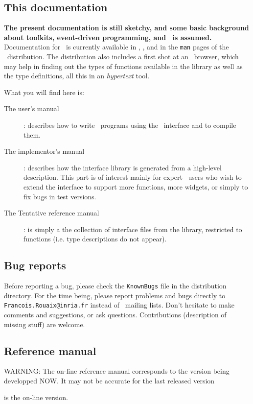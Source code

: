 \section*{This documentation}
{\bf The present documentation is still sketchy, and some basic background
about toolkits, event-driven programming, and \tk\ is assumed.}
Documentation for \tk\ is currently available in \cite{ouster94},
\cite{welch94}, and in the {\tt man} pages of the \tk\ distribution.
The distribution also includes a first shot at an \caml\ browser, which may
help in finding out the types of functions available in the library as well as
the type definitions, all this in an {\em hypertext} tool.


What you will find here is:
\begin{description}
\item[The user's manual] : describes how to write \caml\ programs using the
\tk\ interface and to compile them. 
\item[The implementor's manual] : describes how the interface library is
generated from a high-level description. This part is of interest mainly for
expert \tk\ users who wish to extend the interface to support more
functions, more widgets, or simply to fix bugs in test versions.
\item[The Tentative reference manual] : is simply a the collection of
interface files from the library, restricted to functions (i.e. type
descriptions do not appear). 
\end{description}

\section*{Bug reports}
Before reporting a bug, please check the \verb|KnownBugs| file in the
distribution directory.
For the time being, please report problems and bugs directly to
\verb|Francois.Rouaix@inria.fr| instead of \caml\ mailing lists.
Don't hesitate to make comments and suggestions, or ask questions.
Contributions (description of missing stuff) are welcome.


\tableofcontents





\begin{htmlonly}
\chapter{Reference manual}
{\Large WARNING: The on-line reference manual corresponds to the version
being developped NOW. It may not be accurate for the last released version}

is the on-line version.
\end{htmlonly}





\appendix



